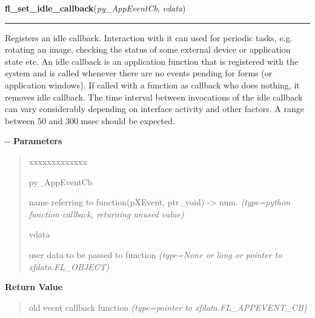 \hspace{.8\funcindent}\begin{boxedminipage}{\funcwidth}

    \raggedright \textbf{fl\_set\_idle\_callback}(\textit{py\_AppEventCb}, \textit{vdata})

    \vspace{-1.5ex}

    \rule{\textwidth}{0.5\fboxrule}
\setlength{\parskip}{2ex}

Registers an idle callback. Interaction with it  can used for periodic
tasks, e.g. rotating an image, checking the status of some external
device or application state etc. An idle callback is an application
function that is registered with the system and is called whenever there
are no events pending for forms (or application windows). If called with
a function as callback who does nothing, it removes idle callback.
The time interval between invocations of the idle callback can vary
considerably depending on interface activity and other factors. A
range between 50 and 300 msec should be expected.

-{}-
\setlength{\parskip}{1ex}
      \textbf{Parameters}
      \vspace{-1ex}

      \begin{quote}
        \begin{Ventry}{xxxxxxxxxxxxx}

          \item[py\_AppEventCb]


name referring to function(pXEvent, ptr\_void) -> num.
            {\it (type=python function callback, returning unused value)}

          \item[vdata]


user data to be passed to function
            {\it (type=None or long or pointer to xfdata.FL\_OBJECT)}

        \end{Ventry}

      \end{quote}

      \textbf{Return Value}
    \vspace{-1ex}

      \begin{quote}

old event callback function
      {\it (type=pointer to xfdata.FL\_APPEVENT\_CB)}

      \end{quote}


\end{boxedminipage}
